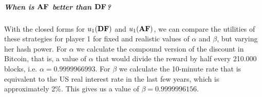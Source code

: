 \documentclass[a4paper,english,cleveref, autoref,numberwithinsect]{lipics-v2019}
\newcommand{\ie}{i.e.$\!$ }
\newcommand{\df}{\text{\rm DF}}
\newcommand{\bdf}{\text{\rm {\bf DF}}}
\newcommand{\af}{\text{\rm AF}}
\newcommand{\baf}{\text{\rm {\bf AF}}}
\newcommand{\pf}[1]{\text{\rm F[{#1}]}}
\newcommand{\bpf}[1]{\text{\rm {\bf F}[{$#1$}]}}
\begin{document}
\subparagraph*{When is $\baf$ better than $\bdf$?}
With the closed forms for $u_1(\bdf)$ and $u_1(\baf)$,
we can compare the utilities of these strategies for player 1 for fixed and realistic values of $\alpha$ and $\beta$, but varying her hash power. 
For $\alpha$ we calculate the compound version of the discount in Bitcoin, that is, 
a value of $\alpha$ that would divide the reward by half every 210.000 blocks, \ie $\alpha = 0.9999966993$. For 
$\beta$ we calculate the 10-minute rate that is equivalent to the US real interest rate in 
the last few years, which is approximately 2\%. %
This gives us a value of $\beta = 0.9999996156$. 

\end{document}
